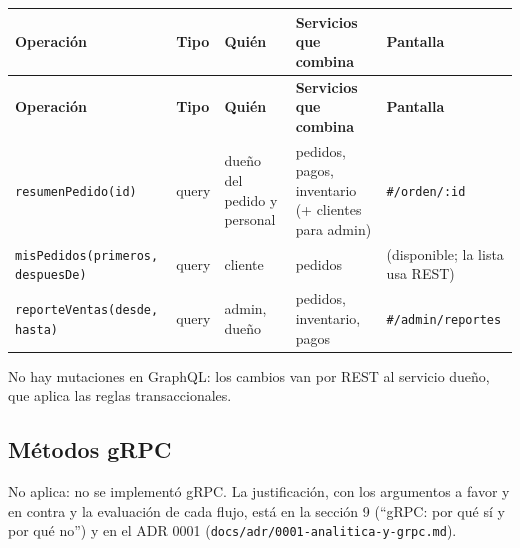 {\footnotesize
\setlength{\tabcolsep}{3pt}\renewcommand{\arraystretch}{1.15}
\begin{longtable}{|>{\raggedright\arraybackslash}p{}|>{\raggedright\arraybackslash}p{}|>{\raggedright\arraybackslash}p{}|>{\raggedright\arraybackslash}p{}|>{\raggedright\arraybackslash}p{}|}
\hline
\textbf{Operación} & \textbf{Tipo} & \textbf{Quién} & \textbf{Servicios que combina} & \textbf{Pantalla} \\ \hline
\endfirsthead
\hline
\textbf{Operación} & \textbf{Tipo} & \textbf{Quién} & \textbf{Servicios que combina} & \textbf{Pantalla} \\ \hline
\endhead
\texttt{resumenPedido(\allowbreak{}id)} & query & dueño del pedido y personal & pedidos, pagos, inventario (+ clientes para admin) & \texttt{\#/\allowbreak{}orden/\allowbreak{}:\allowbreak{}id} \\ \hline
\texttt{misPedidos(\allowbreak{}primeros,\allowbreak{} despuesDe)} & query & cliente & pedidos & (disponible; la lista usa REST) \\ \hline
\texttt{reporteVentas(\allowbreak{}desde,\allowbreak{} hasta)} & query & admin, dueño & pedidos, inventario, pagos & \texttt{\#/\allowbreak{}admin/\allowbreak{}reportes} \\ \hline
\end{longtable}
}

No hay mutaciones en GraphQL: los cambios van por REST al servicio dueño, que aplica las reglas transaccionales.


\subsection{Métodos gRPC}

No aplica: no se implementó gRPC. La justificación, con los argumentos a favor y en contra y la evaluación de cada flujo, está en la sección 9 (“gRPC: por qué sí y por qué no”) y en el ADR 0001 (\texttt{docs/\allowbreak{}adr/\allowbreak{}0001-\allowbreak{}analitica-\allowbreak{}y-\allowbreak{}grpc.\allowbreak{}md}).

